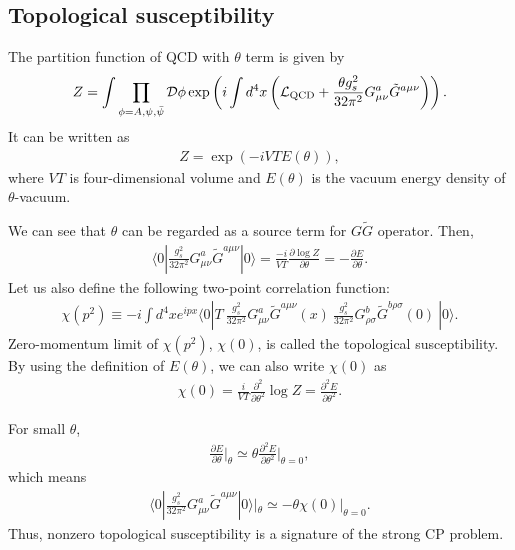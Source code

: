 \documentclass[11pt,a4paper]{article}
\begin{document}
\subsection{Topological susceptibility}
The partition function of QCD with $\theta$ term is given by
\begin{align}
    Z = \int \prod_{\phi=A,\psi,\bar\psi}{\cal D}\phi \exp\left( i \int d^4 x \left( {\cal L}_{\rm QCD} + \frac{\theta g_s^2}{32\pi^2} G_{\mu\nu}^a \tilde G^{a\mu\nu} \right)  \right).
\end{align}
It can be written as
\begin{align}
    Z = \exp\left( -i VT E(\theta) \right),
\end{align}
where $VT$ is four-dimensional volume and $E(\theta)$ is the vacuum energy density of $\theta$-vacuum.

We can see that $\theta$ can be regarded as a source term for $G\tilde G$ operator. Then,
\begin{align}
    \langle 0| \frac{g_s^2}{32\pi^2} G^a_{\mu\nu} \tilde G^{a\mu\nu} |0 \rangle = \frac{-i}{VT} \frac{\partial \log Z}{\partial \theta} = -\frac{\partial E}{\partial \theta}.
\end{align}
Let us also define the following two-point correlation function:
\begin{align}
\chi(p^2) \equiv -i\int d^4x e^{ipx} \langle0|
T
~\frac{g_s^2}{32\pi^2} G^a_{\mu\nu} \tilde G^{a\mu\nu}(x)
~\frac{g_s^2}{32\pi^2} G^b_{\rho\sigma} \tilde G^{b\rho\sigma}(0)
~|0\rangle. \label{eq:chi definition}
\end{align}
%
Zero-momentum limit of $\chi(p^2)$, $\chi(0)$, is called the topological susceptibility. By using the definition of $E(\theta)$, we can also write $\chi(0)$ as
\begin{align}
    \chi(0) = \frac{i}{VT}\frac{\partial^2}{\partial \theta^2} \log Z = \frac{\partial^2 E}{\partial \theta^2}.
\end{align}

For small $\theta$,
\begin{align}
    \frac{\partial E}{\partial \theta} \biggr|_\theta \simeq \theta \frac{\partial^2 E}{\partial \theta^2} \biggr|_{\theta=0},
\end{align}
which means
\begin{align}
    \langle 0| \frac{g_s^2}{32\pi^2} G^a_{\mu\nu} \tilde G^{a\mu\nu} |0 \rangle |_\theta \simeq -\theta \chi(0)|_{\theta=0}. \label{eq:VEV GGtilde}
\end{align}
Thus, nonzero topological susceptibility is a signature of the strong CP problem.
\end{document}
